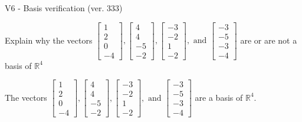 \begin{exercise}
  \begin{exerciseTitle}V6 - Basis verification (ver. 333)\end{exerciseTitle}
  \begin{exerciseStatement}
    Explain why the vectors \(\left[\begin{array}{r}
1 \\
2 \\
0 \\
-4
\end{array}\right] , \left[\begin{array}{r}
4 \\
4 \\
-5 \\
-2
\end{array}\right] , \left[\begin{array}{r}
-3 \\
-2 \\
1 \\
-2
\end{array}\right] , \text{ and } \left[\begin{array}{r}
-3 \\
-5 \\
-3 \\
-4
\end{array}\right]\) are or are not a basis of \(\mathbb{R}^4\)	


  \end{exerciseStatement}
  \begin{exerciseAnswer}
   The vectors \(\left[\begin{array}{r}
1 \\
2 \\
0 \\
-4
\end{array}\right] , \left[\begin{array}{r}
4 \\
4 \\
-5 \\
-2
\end{array}\right] , \left[\begin{array}{r}
-3 \\
-2 \\
1 \\
-2
\end{array}\right] , \text{ and } \left[\begin{array}{r}
-3 \\
-5 \\
-3 \\
-4
\end{array}\right]\) 
  	 are  a basis of \(\mathbb{R}^4\).
  


  \end{exerciseAnswer}
\end{exercise}